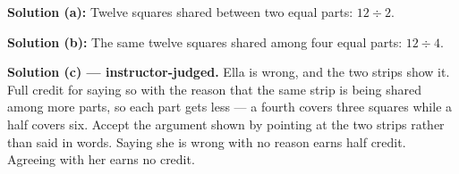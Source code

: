 \documentclass[12pt]{article}
\begin{document}

\textbf{Solution (a):} Twelve squares shared between two equal parts: $12 \div 2$. 

\textbf{Solution (b):} The same twelve squares shared among four equal parts: $12 \div 4$. 

\textbf{Solution (c) --- instructor-judged.} Ella is wrong, and the two strips show it. Full credit for saying so with the reason that the same strip is being shared among more parts, so each part gets less --- a fourth covers three squares while a half covers six. Accept the argument shown by pointing at the two strips rather than said in words. Saying she is wrong with no reason earns half credit. Agreeing with her earns no credit.
\end{document}
